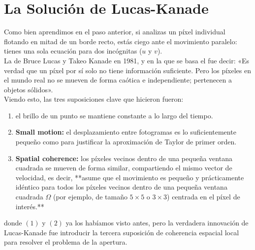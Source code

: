 \section{La Solución de Lucas-Kanade}
\noindent
Como bien aprendimos en el paso anterior, si analizas un píxel individual flotando en mitad de un borde recto, estás ciego ante el movimiento paralelo: tienes una sola ecuación para dos incógnitas ($u$ y $v$). \\

\noindent
La   de Bruce Lucas y Takeo Kanade en 1981, y en la que se basa el  fue decir: «Es verdad que un píxel por sí solo no tiene información suficiente. Pero los píxeles en el mundo real no se mueven de forma caótica e independiente; pertenecen a objetos sólidos». \\

\noindent
Viendo esto, las tres suposiciones clave que hicieron fueron:
\begin{enumerate}
    \item {} el brillo de un punto se mantiene constante a lo largo del tiempo.
    \item \textbf{Small motion:} el desplazamiento entre fotogramas es lo suficientemente pequeño como para justificar la aproximación de Taylor de primer orden.
    \item \textbf{Spatial coherence:} los píxeles vecinos dentro de una pequeña ventana cuadrada se mueven de forma similar, compartiendo el mismo vector de velocidad, es decir, **asume que el movimiento es pequeño y prácticamente idéntico para todos los píxeles vecinos dentro de una pequeña ventana cuadrada $\Omega$ (por ejemplo, de tamaño $5 \times 5$ o $3 \times 3$) centrada en el píxel de interés.** \\
\end{enumerate}
donde $(1)$ y $(2)$ ya los habíamos visto antes, pero la verdadera innovación de Lucas-Kanade fue introducir la tercera suposición de coherencia espacial local para resolver el problema de la apertura. \\

